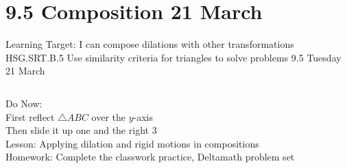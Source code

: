 \section{9.5 Composition \hfill 21 March \,}
\begin{frame}{Learning Target: I can compose dilations with other transformations}
  {HSG.SRT.B.5 Use similarity criteria for triangles to solve problems \hfill \alert{9.5 Tuesday 21 March}}
  \begin{columns}
    Do Now:\\
    First reflect $\triangle ABC$ over the $y$-axis \\
    Then slide it up one and the right 3 \\[0.5cm]
    Lesson: Applying dilation and rigid motions in compositions \\[0.5cm]
    Homework: Complete the classwork practice, Deltamath problem set \\[0.5cm]
    \begin{flushright}
    \end{flushright}
  \end{columns}
\end{frame}

